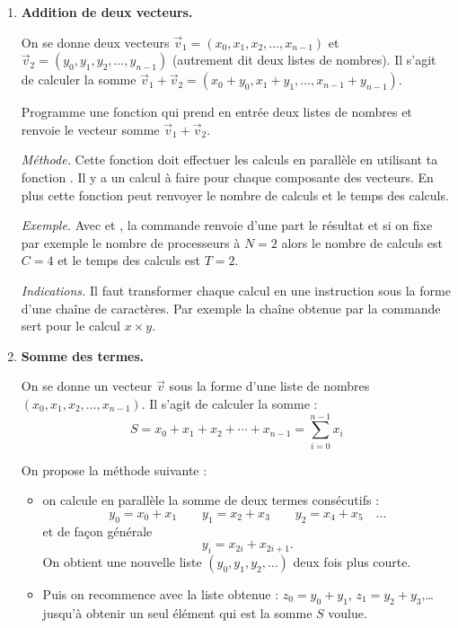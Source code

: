 \documentclass[11pt,class=report,crop=false]{standalone}
\begin{document}
\begin{activite}
\begin{enumerate}
    \item \textbf{Addition de deux vecteurs.}
    
    On se donne deux vecteurs $\vec v_1 = (x_0,x_1,x_2,\ldots,x_{n-1})$ et 
    $\vec v_2 = (y_0,y_1,y_2,\ldots,y_{n-1})$ (autrement dit deux listes de nombres). Il s'agit de calculer la somme 
    $\vec v_1 + \vec v_2 = (x_0+y_0,x_1+y_1,\ldots,x_{n-1}+y_{n-1})$.
    
    Programme une fonction  qui prend en entrée deux listes de nombres et renvoie le vecteur somme $\vec v_1 + \vec v_2$.
    
    \emph{Méthode.} Cette fonction doit effectuer les calculs en parallèle en utilisant ta fonction 
     . Il y a un calcul à faire pour chaque composante des vecteurs.
     En plus cette fonction peut renvoyer le nombre de calculs et le temps des calculs.
    
    \emph{Exemple.} Avec  et , la commande 
     renvoie d'une part le résultat \ci{[11, 13, 15, 17]}
    et si on fixe par exemple le nombre de processeurs à $N=2$ alors le nombre de calculs est $C=4$ et le temps des calculs est $T=2$.
    
    \emph{Indications.} Il faut transformer chaque calcul en une instruction sous la forme d'une chaîne de caractères. Par exemple la chaîne obtenue par la commande \og{}\fg{} sert pour le calcul \og{}$x \times y$\fg{}.
    
    \item \textbf{Somme des termes.} 
    
    On se donne un vecteur $\vec v$ sous la forme d'une liste de nombres $(x_0,x_1,x_2,\ldots,x_{n-1})$. Il s'agit de calculer la somme :
    $$S = x_0+x_1+x_2+\cdots+x_{n-1} = \sum_{i=0}^{n-1} x_i$$
    
    On propose la méthode suivante :
    \begin{itemize}
      \item on calcule en parallèle la somme de deux termes consécutifs :
      $$y_0 = x_0 + x_1\qquad y_1 = x_2+x_3 \qquad y_2 = x_4+x_5 \quad \ldots$$
      et de façon générale
      $$y_i = x_{2i}+x_{2i+1}.$$
      On obtient une nouvelle liste $(y_0,y_1,y_2,\ldots)$ deux fois plus courte.
      \item Puis on recommence avec la liste obtenue : $z_0 = y_0+y_1$, $z_1=y_2+y_3$,\ldots{} jusqu'à obtenir un seul élément qui est la somme $S$ voulue.
    \end{itemize}
 

\end{enumerate}
\end{activite}
\end{document}
